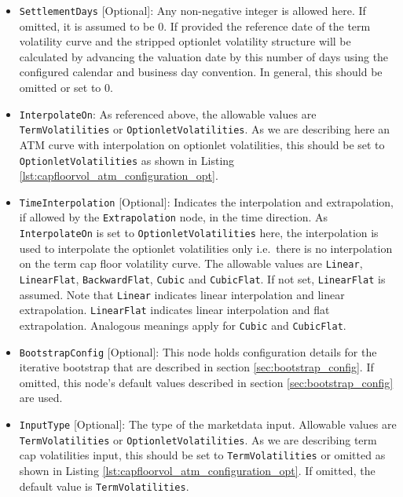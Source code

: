 \begin{itemize}
\item \lstinline!SettlementDays! [Optional]:
Any non-negative integer is allowed here. If omitted, it is assumed to be 0. If provided the reference date of the term volatility curve and the stripped optionlet volatility structure will be calculated by advancing the valuation date by this number of days using the configured calendar and business day convention. In general, this should be omitted or set to 0.

\item \lstinline!InterpolateOn!:
As referenced above, the allowable values are \lstinline!TermVolatilities! or \lstinline!OptionletVolatilities!. As we are describing here an ATM curve with interpolation on optionlet volatilities, this should be set to \lstinline!OptionletVolatilities! as shown in Listing \ref{lst:capfloorvol_atm_configuration_opt}.

\item \lstinline!TimeInterpolation! [Optional]:
Indicates the interpolation and extrapolation, if allowed by the \lstinline!Extrapolation! node, in the time direction. As \lstinline!InterpolateOn! is set to \lstinline!OptionletVolatilities! here, the interpolation is used to interpolate the optionlet volatilities only i.e.\ there is no interpolation on the term cap floor volatility curve. The allowable values are \lstinline!Linear!, \lstinline!LinearFlat!, \lstinline!BackwardFlat!, \lstinline!Cubic! and \lstinline!CubicFlat!. If not set, \lstinline!LinearFlat! is assumed. Note that \lstinline!Linear! indicates linear interpolation and linear extrapolation. \lstinline!LinearFlat! indicates linear interpolation and flat extrapolation. Analogous meanings apply for \lstinline!Cubic! and \lstinline!CubicFlat!.

\item \lstinline!BootstrapConfig! [Optional]:
This node holds configuration details for the iterative bootstrap that are described in section \ref{sec:bootstrap_config}. If omitted, this node's default values described in section \ref{sec:bootstrap_config} are used.

\item \lstinline!InputType! [Optional]:
The type of the marketdata input. Allowable values are \lstinline!TermVolatilities! or \lstinline!OptionletVolatilities!. As we are describing term cap volatilities input, this should be set to \lstinline!TermVolatilities! or omitted as shown in Listing \ref{lst:capfloorvol_atm_configuration_opt}. If omitted, the default value is \lstinline!TermVolatilities!.

\end{itemize}

